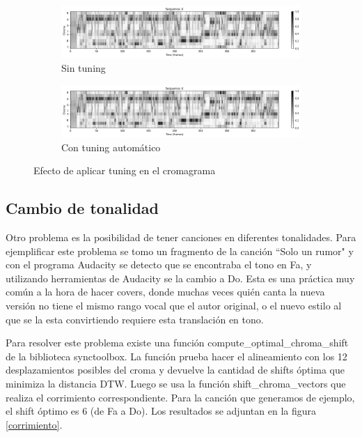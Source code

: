 \documentclass{article}
\begin{document}
\begin{figure}[!h]
\centering
\begin{subfigure}{\textwidth}
    \includegraphics[width=\textwidth]{chromas/solo_un_rumor_sin.png}
    \caption{Sin tuning}
    \label{16_cropped}
\end{subfigure}
\vfill
\begin{subfigure}{\textwidth}
    \includegraphics[width=\textwidth]{chromas/solo_un_rumor_tuning.png}
    \caption{Con tuning automático}
    \label{fig:16}
\end{subfigure}
\caption{Efecto de aplicar tuning en el cromagrama}
\label{tuning}
\end{figure}

\subsection{Cambio de tonalidad}

Otro problema es la posibilidad de tener canciones en diferentes tonalidades. Para ejemplificar este problema se tomo un fragmento de la canción ``Solo un rumor" y con el programa Audacity se detecto que se encontraba el tono en Fa, y utilizando herramientas de Audacity se la cambio a Do. Esta es una práctica muy común a la hora de hacer covers, donde muchas veces quién canta la nueva versión no tiene el mismo rango vocal que el autor original, o el nuevo estilo al que se la esta convirtiendo requiere esta translación en tono. 

Para resolver este problema existe una función compute\_optimal\_chroma\_shift de la biblioteca synctoolbox. La función prueba hacer el alineamiento con los 12 desplazamientos posibles del croma y devuelve la cantidad de shifts óptima que minimiza la distancia DTW. Luego se usa la función shift\_chroma\_vectors que realiza el corrimiento correspondiente. Para la canción que generamos de ejemplo, el shift óptimo es 6 (de Fa a Do). Los resultados se adjuntan en la figura \ref{corrimiento}.
\end{document}

